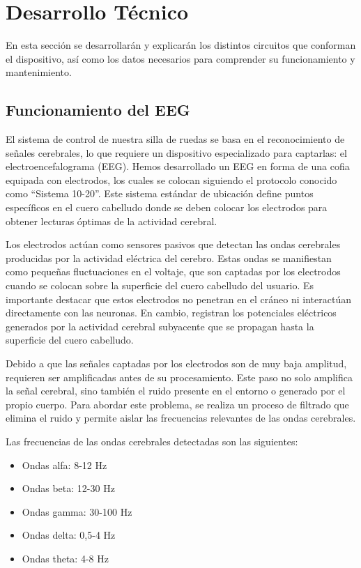 \documentclass{article}
\begin{document}
\section{Desarrollo Técnico}
En esta sección se desarrollarán y explicarán los distintos circuitos que conforman el dispositivo, así como los datos necesarios para comprender su funcionamiento y mantenimiento.

\subsection{Funcionamiento del EEG}

El sistema de control de nuestra silla de ruedas se basa en el reconocimiento de señales cerebrales, lo que requiere un dispositivo especializado para captarlas: el electroencefalograma (EEG). Hemos desarrollado un EEG en forma de una cofia equipada con electrodos, los cuales se colocan siguiendo el protocolo conocido como “Sistema 10-20”. Este sistema estándar de ubicación define puntos específicos en el cuero cabelludo donde se deben colocar los electrodos para obtener lecturas óptimas de la actividad cerebral.

Los electrodos actúan como sensores pasivos que detectan las ondas cerebrales producidas por la actividad eléctrica del cerebro. Estas ondas se manifiestan como pequeñas fluctuaciones en el voltaje, que son captadas por los electrodos cuando se colocan sobre la superficie del cuero cabelludo del usuario. Es importante destacar que estos electrodos no penetran en el cráneo ni interactúan directamente con las neuronas. En cambio, registran los potenciales eléctricos generados por la actividad cerebral subyacente que se propagan hasta la superficie del cuero cabelludo.

Debido a que las señales captadas por los electrodos son de muy baja amplitud, requieren ser amplificadas antes de su procesamiento. Este paso no solo amplifica la señal cerebral, sino también el ruido presente en el entorno o generado por el propio cuerpo. Para abordar este problema, se realiza un proceso de filtrado que elimina el ruido y permite aislar las frecuencias relevantes de las ondas cerebrales.

Las frecuencias de las ondas cerebrales detectadas son las siguientes:

\begin{itemize}
    \item Ondas alfa: 8-12 Hz
    \item Ondas beta: 12-30 Hz
    \item Ondas gamma: 30-100 Hz
    \item Ondas delta: 0,5-4 Hz
    \item Ondas theta: 4-8 Hz
\end{itemize}
\end{document}
